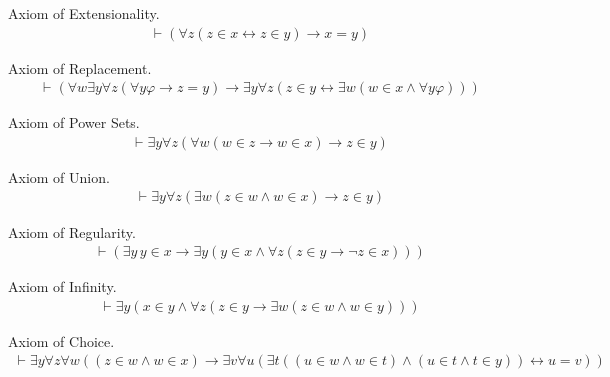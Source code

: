 \begin{axiom}\label{axi:ax-ext} Axiom of Extensionality.  
\begin{align}
\vdash ( \forall z ( z \in x \leftrightarrow z \in y ) \rightarrow x = y
    )\label{eq:ax-ext}\tag{ax-ext}
\end{align}
\end{axiom}
\begin{axiom}\label{axi:ax-rep} Axiom of Replacement.  
\begin{align}
\vdash ( \forall w \exists y \forall z ( \forall y \varphi \rightarrow z = y )
    \rightarrow \exists y \forall z ( z \in y \leftrightarrow \exists w ( w \in
    x \wedge \forall y \varphi ) ) )\label{eq:ax-rep}\tag{ax-rep}
\end{align}
\end{axiom}
\begin{axiom}\label{axi:ax-pow} Axiom of Power Sets. 
\begin{align}
\vdash \exists y \forall z ( \forall w ( w \in z \rightarrow w \in x )
    \rightarrow z \in y )\label{eq:ax-pow}\tag{ax-pow}
\end{align}
\end{axiom}
\begin{axiom}\label{axi:ax-un} Axiom of Union. 
\begin{align}
\vdash \exists y \forall z ( \exists w ( z \in w \wedge w \in x ) \rightarrow z
    \in y )\label{eq:ax-un}\tag{ax-un}
\end{align}
\end{axiom}
\begin{axiom}\label{axi:ax-reg} Axiom of Regularity. 
\begin{align}
\vdash ( \exists y \,y \in x \rightarrow \exists y ( y \in x \wedge \forall z (
    z \in y \rightarrow \lnot z \in x ) ) )\label{eq:ax-reg}\tag{ax-reg}
\end{align}
\end{axiom}
\begin{axiom}\label{axi:ax-inf} Axiom of Infinity. 
\begin{align}
\vdash \exists y ( x \in y \wedge \forall z ( z \in y \rightarrow \exists w ( z
    \in w \wedge w \in y ) ) )\label{eq:ax-inf}\tag{ax-inf}
\end{align}
\end{axiom}
\begin{axiom}\label{axi:ax-ac} Axiom of Choice.  
\begin{align}
\vdash \exists y \forall z \forall w ( ( z \in w \wedge w \in x ) \rightarrow 
    \exists v \forall u ( \exists t ( ( u \in w \wedge w \in t ) \wedge ( u \in
    t \wedge t \in y ) ) \leftrightarrow u = v ) )\label{eq:ax-ac}\tag{ax-ac}
\end{align}
\end{axiom}


